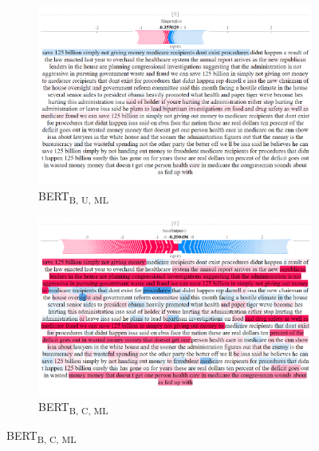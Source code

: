 \begin{figure}[!h]

    \begin{subfigure}[t]{0.4\textwidth}
        \includegraphics[width=\textwidth]{figs/all_F/bert-b-ml-u.png}
        \caption{{BERT}\textsubscript{B, U, ML}}
    \end{subfigure}
    \hspace{\fill} %
    \begin{subfigure}[t]{0.4\textwidth}
        \includegraphics[width=\linewidth]{figs/all_F/bert-b-ml-c.png}
        \caption{{BERT}\textsubscript{B, C, ML}}
    \end{subfigure}




\end{figure}
